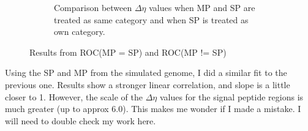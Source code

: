 \documentclass[11pt]{labbook}
\begin{document}
\begin{figure}
\begin{subfigure}{0.52\textwidth}
\caption{Comparison between $\Delta\eta$ values when MP and SP are treated as same category and when SP is treated as own category.}
\end{subfigure}
\caption{Results from ROC(MP = SP) and ROC(MP != SP)}
\end{figure}


Using the SP and MP from the simulated genome, I did a similar fit to the previous one. Results show a stronger linear correlation, and slope is a little closer to 1. However, the scale of the $\Delta\eta$ values for the signal peptide regions is much greater (up to approx 6.0). This makes me wonder if I made a mistake. I will need to double check my work here.
\end{document}

